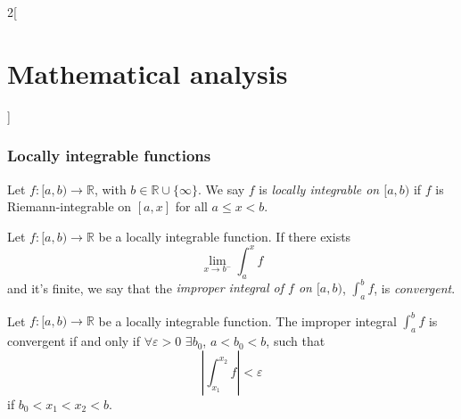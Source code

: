 \documentclass[../../../main.tex]{subfiles}
\begin{document}
\begin{multicols}{2}[\section{Mathematical analysis}]
\subsubsection*{Locally integrable functions}
\begin{definition}
Let $f:[a,b)\rightarrow\mathbb{R}$, with $b\in\mathbb{R}\cup\{\infty\}$. We say $f$ is \textit{locally integrable on $[a,b)$} if $f$ is Riemann-integrable on $[a,x]$ for all $a\leq x<b$.
\end{definition}
\begin{definition}
Let $f:[a,b)\rightarrow\mathbb{R}$ be a locally integrable function. If there exists $$\lim_{x\to b^-}\int_a^x f$$ and it's finite, we say that the \textit{improper integral of $f$ on $[a,b)$}, $\displaystyle\int_a^b f$, is \textit{convergent}.
\end{definition}
\begin{theorem}
Let $f:[a,b)\rightarrow\mathbb{R}$ be a locally integrable function. The improper integral $\displaystyle\int_a^b f$ is convergent if and only if $\forall\varepsilon>0$ $\exists b_0$, $a<b_0<b$, such that $$\left|\int_{x_1}^{x_2} f\right|<\varepsilon$$ if $b_0<x_1<x_2<b$.
\end{theorem}

\end{multicols}
\end{document}
